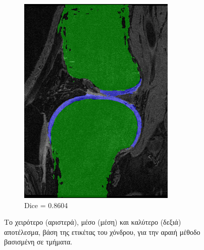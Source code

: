 \documentclass[a4paper,12pt]{article}
\begin{document}
\begin{figure}[H]
\begin{subfigure}[b]{0.32\linewidth}
    \includegraphics[width=\linewidth]{final_SPBM_best.png}
    \caption{Dice = 0.8604}
    \end{subfigure}

    \caption{Το χειρότερο (αριστερά), μέσο (μέση) και καλύτερο (δεξιά)
             αποτέλεσμα, βάση της ετικέτας του χόνδρου, για την αραιή μέθοδο
             βασισμένη σε τμήματα.}
    \label{fig:final_dice_SPBM}
\end{figure}
\end{document}
